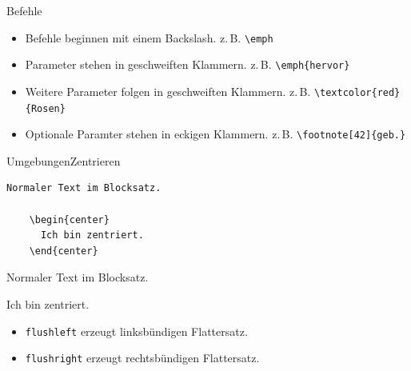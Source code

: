 \begin{Frame}[fragile]{Befehle}
  \begin{itemize}
    \item Befehle beginnen mit einem Backslash.\newline
      z.\,B. \lstinline-\emph-
    \item Parameter stehen in geschweiften Klammern.\newline
      z.\,B. \lstinline-\emph{hervor}-
    \item Weitere Parameter folgen in geschweiften Klammern.\newline
      z.\,B. \lstinline-\textcolor{red}{Rosen}-
    \item Optionale Paramter stehen in eckigen Klammern.
      z.\,B. \lstinline-\footnote[42]{geb.}-
  \end{itemize}
\end{Frame}

\begin{Frame}[fragile]{Umgebungen}{Zentrieren}
  \begin{lstlisting}[gobble=4]
    Normaler Text im Blocksatz.

    \begin{center}
      Ich bin zentriert.
    \end{center}
  \end{lstlisting}

  \xxx

  \begin{minipage}{\textwidth}
    Normaler Text im Blocksatz.
    \lorem
  \end{minipage}  

  \begin{center}
    Ich bin zentriert. \lorem
  \end{center}

  \pause

  \begin{itemize}
    \item \lstinline-flushleft- erzeugt \alert{linksbündigen Flattersatz}.
    \item \lstinline-flushright- erzeugt \alert{rechtsbündigen Flattersatz}.
  \end{itemize}
\end{Frame}


